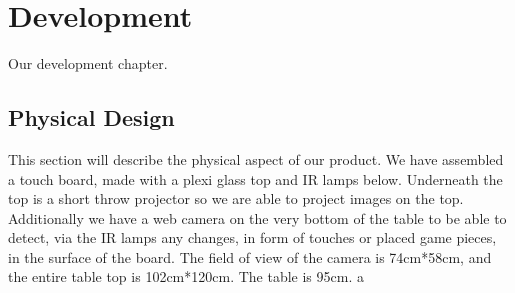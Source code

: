 \chapter{Development}\label{ch:development}
Our development chapter. 

\section{Physical Design} 
This section will describe the physical aspect of our product.
We have assembled a touch board, made with a plexi glass top and IR lamps below. Underneath the top is a short throw projector so we are able to project images on the top. Additionally we have a web camera on the very bottom of the table to be able to detect, via the IR lamps any changes, in form of touches or placed game pieces, in the surface of the board. 
The field of view of the camera is 74cm*58cm, and the entire table top is 102cm*120cm. The table is 95cm. 
a
